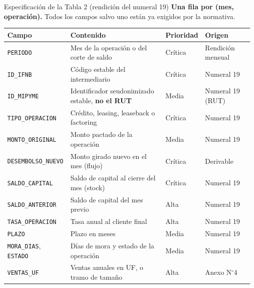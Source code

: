 \documentclass[aspectratio=169]{beamer}
\begin{document}
\begin{frame}{Especificación de la Tabla 2 (rendición del numeral 19)}
\textbf{Una fila por (mes, operación).} Todos los campos salvo uno están ya exigidos por la normativa.
\begin{table}
\centering
\scriptsize
\begin{tabular}{@{}p{3.1cm}p{5.1cm}p{1.4cm}p{2.2cm}@{}}
\toprule
\textbf{Campo} & \textbf{Contenido} & \textbf{Prioridad} & \textbf{Origen} \\
\midrule
\texttt{PERIODO} & Mes de la operación o del corte de saldo & Crítica & Rendición mensual \\
\texttt{ID\_IFNB} & Código estable del intermediario & Crítica & Numeral 19 \\
\texttt{ID\_MIPYME} & Identificador seudonimizado estable, \textbf{no el RUT} & Media & Numeral 19 (RUT) \\
\texttt{TIPO\_OPERACION} & Crédito, leasing, leaseback o factoring & Crítica & Numeral 19 \\
\texttt{MONTO\_ORIGINAL} & Monto pactado de la operación & Media & Numeral 19 \\
\texttt{DESEMBOLSO\_NUEVO} & Monto girado nuevo en el mes (flujo) & Crítica & Derivable \\
\texttt{SALDO\_CAPITAL} & Saldo de capital al cierre del mes (stock) & Crítica & Numeral 19 \\
\texttt{SALDO\_ANTERIOR} & Saldo de capital del mes previo & Alta & Numeral 19 \\
\texttt{TASA\_OPERACION} & Tasa anual al cliente final & Alta & Numeral 19 \\
\texttt{PLAZO} & Plazo en meses & Media & Numeral 19 \\
\texttt{MORA\_DIAS}, \texttt{ESTADO} & Días de mora y estado de la operación & Media & Numeral 19 \\
\texttt{VENTAS\_UF} & Ventas anuales en UF, o tramo de tamaño & Alta & Anexo N$^\circ$4 \\
\bottomrule
\end{tabular}
\end{table}
\end{frame}
\end{document}
